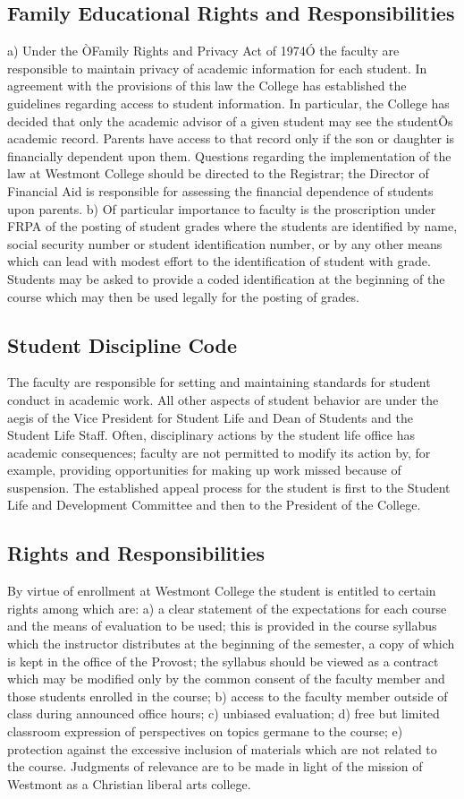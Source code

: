 \documentclass[letterpaper, 11pt]{article}
\begin{document}
	\subsection{Family Educational Rights and Responsibilities}
		a) Under the ÒFamily Rights and Privacy Act of 1974Ó the faculty are responsible to maintain privacy of academic information for each student.  In agreement with the provisions of this law the College has established the guidelines regarding access to student information.  In particular, the College has decided that only the academic advisor of a given student may see the studentÕs academic record.  Parents have access to that record only if the son or daughter is financially dependent upon them.  Questions regarding the implementation of the law at Westmont College should be directed to the Registrar; the Director of Financial Aid is responsible for assessing the financial dependence of students upon parents.
		b) Of particular importance to faculty is the proscription under FRPA of the posting of student grades where the students are identified by name, social security number or student identification number, or by any other means which can lead with modest effort to the identification of student with grade.  Students may be asked to provide a coded identification at the beginning of the course which may then be used legally for the posting of grades.
	\subsection{Student Discipline Code}
		The faculty are responsible for setting and maintaining standards for student conduct in academic work.  All other aspects of student behavior are under the aegis of the Vice President for Student Life and Dean of Students and the Student Life Staff.  Often, disciplinary actions by the student life office has academic consequences; faculty are not permitted to modify its action by, for example, providing opportunities for making up work missed because of suspension.  The established appeal process for the student is first to the Student Life and Development Committee and then to the President of the College.
	\subsection{Rights and Responsibilities}
		By virtue of enrollment at Westmont College the student is entitled to certain rights among which are:
		a) a clear statement of the expectations for each course and the means of evaluation to be used; this is provided in the course syllabus which the instructor distributes at the beginning of the semester, a copy of which is kept in the office of the Provost; the syllabus should be viewed as a contract which may be modified only by the common consent of the faculty member and those students enrolled in the course;
		b) access to the faculty member outside of class during announced office hours;
		c) unbiased evaluation;
		d) free but limited classroom expression of perspectives on topics germane to the course;
		e) protection against the excessive inclusion of materials which are not related to the course. Judgments of relevance are to be made in light of the mission of Westmont as a Christian liberal arts college.
\end{document}
